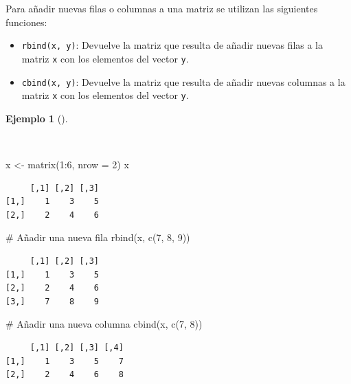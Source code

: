 \documentclass[
  a4paper,
]{scrreport}
\newenvironment{Shaded}{\begin{snugshade}}{\end{snugshade}}
\newcommand{\AttributeTok}[1]{\textcolor[rgb]{0.40,0.45,0.13}{#1}}
\newcommand{\CommentTok}[1]{\textcolor[rgb]{0.37,0.37,0.37}{#1}}
\newcommand{\DecValTok}[1]{\textcolor[rgb]{0.68,0.00,0.00}{#1}}
\newcommand{\FunctionTok}[1]{\textcolor[rgb]{0.28,0.35,0.67}{#1}}
\newcommand{\NormalTok}[1]{\textcolor[rgb]{0.00,0.23,0.31}{#1}}
\newcommand{\OtherTok}[1]{\textcolor[rgb]{0.00,0.23,0.31}{#1}}
\newcommand{\SpecialCharTok}[1]{\textcolor[rgb]{0.37,0.37,0.37}{#1}}
\providecommand{\tightlist}{%
  \setlength{\itemsep}{0pt}\setlength{\parskip}{0pt}}\usepackage{longtable,booktabs,array}
\theoremstyle{definition}
\theoremstyle{definition}
\newtheorem{example}{Ejemplo}[chapter]
\theoremstyle{remark}
\begin{document}
Para añadir nuevas filas o columnas a una matriz se utilizan las
siguientes funciones:

\begin{itemize}
\tightlist
\item
  \texttt{rbind(x,\ y)}: Devuelve la matriz que resulta de añadir nuevas
  filas a la matriz \texttt{x} con los elementos del vector \texttt{y}.
\item
  \texttt{cbind(x,\ y)}: Devuelve la matriz que resulta de añadir nuevas
  columnas a la matriz \texttt{x} con los elementos del vector
  \texttt{y}.
\end{itemize}

\begin{example}[]\protect\hypertarget{exm-añadir-filas-columnas-matriz}{}\label{exm-añadir-filas-columnas-matriz}

~

\begin{Shaded}
\begin{Highlighting}[]
\NormalTok{x }\OtherTok{\textless{}{-}} \FunctionTok{matrix}\NormalTok{(}\DecValTok{1}\SpecialCharTok{:}\DecValTok{6}\NormalTok{, }\AttributeTok{nrow =} \DecValTok{2}\NormalTok{)}
\NormalTok{x}
\end{Highlighting}
\end{Shaded}

\begin{verbatim}
     [,1] [,2] [,3]
[1,]    1    3    5
[2,]    2    4    6
\end{verbatim}

\begin{Shaded}
\begin{Highlighting}[]
\CommentTok{\# Añadir una nueva fila}
\FunctionTok{rbind}\NormalTok{(x, }\FunctionTok{c}\NormalTok{(}\DecValTok{7}\NormalTok{, }\DecValTok{8}\NormalTok{, }\DecValTok{9}\NormalTok{))}
\end{Highlighting}
\end{Shaded}

\begin{verbatim}
     [,1] [,2] [,3]
[1,]    1    3    5
[2,]    2    4    6
[3,]    7    8    9
\end{verbatim}

\begin{Shaded}
\begin{Highlighting}[]
\CommentTok{\# Añadir una nueva columna}
\FunctionTok{cbind}\NormalTok{(x, }\FunctionTok{c}\NormalTok{(}\DecValTok{7}\NormalTok{, }\DecValTok{8}\NormalTok{))}
\end{Highlighting}
\end{Shaded}

\begin{verbatim}
     [,1] [,2] [,3] [,4]
[1,]    1    3    5    7
[2,]    2    4    6    8
\end{verbatim}

\end{example}
\end{document}
